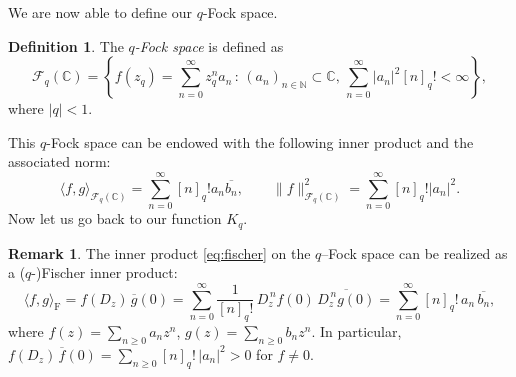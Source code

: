 \documentclass[10pt]{amsart}
\theoremstyle{plain}
\theoremstyle{definition}
\newtheorem{definition}[theorem]{Definition}
\newtheorem{remark}[theorem]{Remark}
\renewcommand{\bar}[1]{\overline{#1}}
\def\ge{\geqslant}
\begin{document}
We are now able to define our $q$-Fock space.

\begin{definition}
The \textit{$q$-Fock space} is defined as
\begin{equation*}
\mathcal{F}_q(\mathbb{C}) = \left\{ f(z_{q}) = \sum_{n=0}^{\infty} z_q^n a_n\, :\, (a_n)_{n\in\mathbb{N}} \subset \mathbb{C},\, \sum_{n=0}^{\infty} \vert a_n \vert^2 [n]_q! < \infty\right\},
\end{equation*}
where $\vert q \vert < 1$.
\end{definition}


This $q$-Fock space can be endowed with the following inner product and the associated norm:
\begin{equation}\label{eq:fischer}
\langle f,g\rangle_{\mathcal{F}_q(\mathbb{C})} = \sum_{n=0}^{\infty} [n]_q! a_n\bar{b_n},\qquad
\lVert f \rVert_{\mathcal{F}_q(\mathbb{C})}^2 = \sum_{n=0}^{\infty} [n]_q! \vert a_n\vert^2.
\end{equation}
Now let us go back to our function $K_q$.


\begin{remark}
The inner product \eqref{eq:fischer} on the $q$–Fock space can be realized as a ($q$-)Fischer inner product:
\begin{equation}\label{eq:qFischer}
\langle f,g\rangle_{\text{F}}
= f(D_z)\,\overline{g}(0)
= \sum_{n=0}^\infty \frac{1}{[n]_q!}\, D_z^{\,n}f(0)\,\overline{D_z^{\,n}g(0)}
= \sum_{n=0}^\infty [n]_q!\, a_n\,\overline{b_n},
\end{equation}
where $f(z)=\sum_{n\ge0} a_n z^n$, $g(z)=\sum_{n\ge0} b_n z^n$. In particular,
$f(D_z)\,\overline{f}(0)=\sum_{n\ge0}[n]_q!\,|a_n|^2>0$ for $f\neq0$.
\end{remark}
\end{document}
